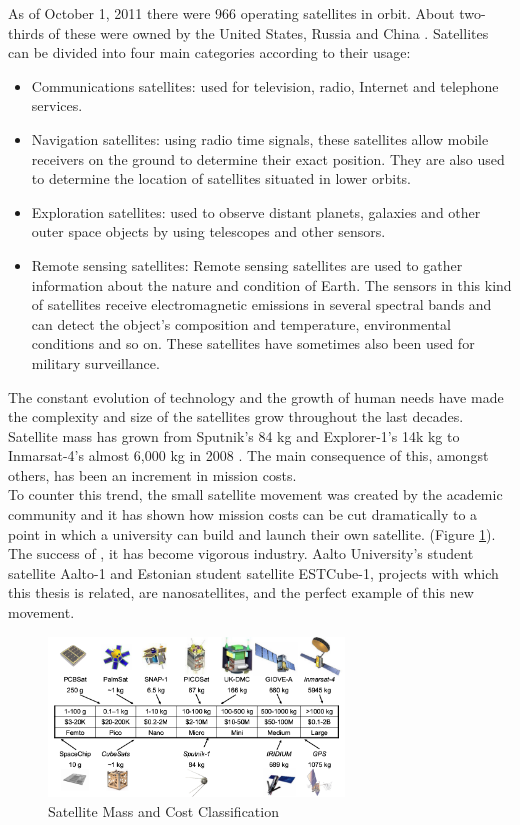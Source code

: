 As of October 1, 2011 there were 966 operating satellites in orbit. About two-thirds of these were owned by the United States, Russia and China \cite{SBFE}. Satellites can be divided into four main categories according to their usage:
\begin{itemize}
\item Communications satellites: used for television, radio, Internet and telephone services.
\item Navigation satellites: using radio time signals, these satellites allow mobile receivers on the ground to determine their exact position. They are also used to determine the location of satellites situated in lower orbits.
\item Exploration satellites: used to observe distant planets, galaxies and other outer space objects by using telescopes and other sensors.
\item Remote sensing satellites: Remote sensing satellites are used to gather information about the nature and condition of Earth. The sensors in this kind of satellites receive electromagnetic emissions in several spectral bands and can detect the object's composition and temperature, environmental conditions and so on. These satellites have sometimes also been used for military surveillance.

\end{itemize}

The constant evolution of technology and the growth of human needs have made the complexity and size of the satellites grow throughout the last decades. Satellite mass has grown from Sputnik's 84 kg and Explorer-1's 14k kg to Inmarsat-4's almost 6,000 kg in 2008 \cite{BARN}. The main consequence of this, amongst others, has been an increment in mission costs.\\

To counter this trend, the small satellite movement was created by the academic community and it has shown how mission costs can be cut dramatically to a point in which a university can build and launch their own satellite. (Figure \ref{f1.3}). The success of , it has become vigorous industry. Aalto University's student satellite Aalto-1 and Estonian student satellite ESTCube-1, projects with which this thesis is related, are nanosatellites, and the perfect example of this new movement.\\

\begin{figure}[H]
\centerline{\includegraphics[width=0.7\textwidth]{images/satclass.png}}
\caption{Satellite Mass and Cost Classification \cite{BARN}}
\label{f1.3}
\end{figure}


